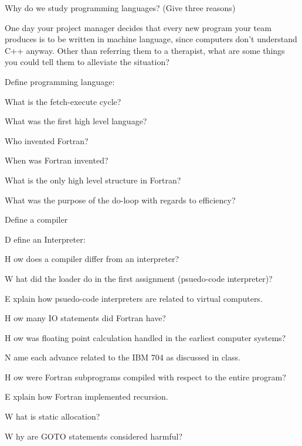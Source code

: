 \documentclass{exam} %
\newcommand{\spacedQuestion}[2][1] {
  \question
  {#2}
  \vspace{\stretch{#1}}
}
\begin{document}
\begin{questions}

  \spacedQuestion {
    Why do we study programming languages? (Give three reasons)
  }


  \spacedQuestion {
    One day your project manager decides that every new program your team produces is to be written in machine language, since computers don't understand C++ anyway. Other than referring them to a therapist, what are some things you could tell them to alleviate the situation?
  }

  \spacedQuestion { Define programming language: }

  \spacedQuestion { What is the fetch-execute cycle? }

  \spacedQuestion { What was the first high level language? }

  \spacedQuestion { Who invented Fortran? }

  \spacedQuestion { When was Fortran invented? }

  \spacedQuestion { What is the only high level structure in Fortran? }

  \spacedQuestion { What was the purpose of the do-loop with regards to efficiency? }

  \spacedQuestion { Define a compiler }

  \pagebreak

  \spacedQuestion Define an Interpreter:

  \spacedQuestion How does a compiler differ from an interpreter?

  \spacedQuestion What did the loader do in the first assignment (psuedo-code interpreter)?

  \spacedQuestion Explain how psuedo-code interpreters are related to virtual computers.

  \spacedQuestion How many IO statements did Fortran have?

  \spacedQuestion How was floating point calculation handled in the earliest computer systems?

  \spacedQuestion Name each advance related to the IBM 704 as discussed in class.

  \spacedQuestion How were Fortran subprograms compiled with respect to the entire program?

  \spacedQuestion Explain how Fortran implemented recursion.

  \spacedQuestion What is static allocation?

  \spacedQuestion Why are GOTO statements considered harmful?


\end{questions}
\end{document}
